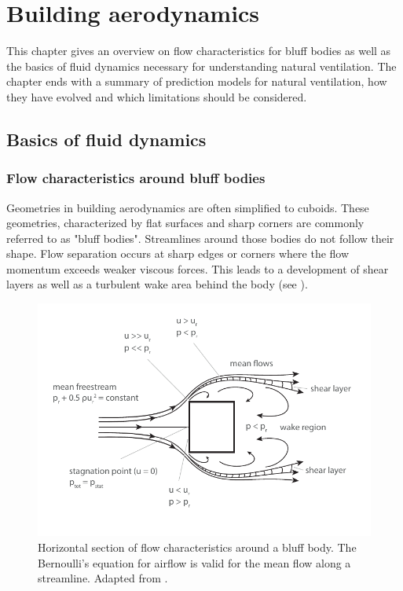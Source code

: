 
\chapter{Building aerodynamics}
\label{chap:building_aerodynamics}

This chapter gives an overview on flow characteristics for bluff bodies as well as the basics of fluid dynamics necessary for understanding natural ventilation. The chapter ends with a summary of prediction models for natural ventilation, how they have evolved and which limitations should be considered.  

%
%


\section{Basics of fluid dynamics}
\label{sec:basic_of_fluid_flow}


\subsection{Flow characteristics around bluff bodies}

Geometries in building aerodynamics are often simplified to cuboids. These geometries, characterized by flat surfaces and sharp corners are commonly referred to as "bluff bodies". Streamlines around those bodies do not follow their shape. Flow separation occurs at sharp edges or corners where the flow momentum exceeds weaker viscous forces. This leads to a development of shear layers as well as a  turbulent wake area behind the body (see ).


\begin{figure}[htb]
	\centering
	\includegraphics[width=0.9\linewidth, trim= 0cm 1cm 0cm 0cm, clip]{images/flow_around_building}
	\captionsetup{format=plain}%
	\caption[Flow characteristics around a bluff body]{Horizontal section of flow characteristics around a bluff body. The Bernoulli's equation for airflow is valid for the mean flow along a streamline. Adapted from \cite{Aynsley1999}.}
	\label{fig:flowaroundbuilding}
\end{figure}





